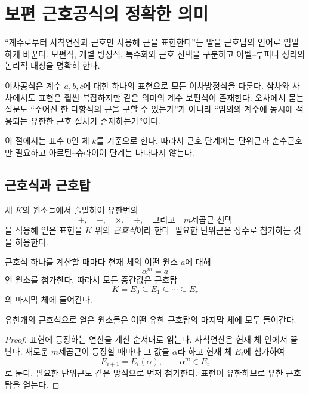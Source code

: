 \clearpage
\section{보편 근호공식의 정확한 의미}
\label{sec:universal-radical-formulas}

\begin{learninggoal}
``계수로부터 사칙연산과 근호만 사용해 근을 표현한다''는 말을 근호탑의 언어로 엄밀하게 바꾼다. 보편식, 개별 방정식, 특수화와 근호 선택을 구분하고 아벨--루피니 정리의 논리적 대상을 명확히 한다.
\end{learninggoal}

이차공식은 계수 $a,b,c$에 대한 하나의 표현으로 모든 이차방정식을 다룬다. 삼차와 사차에서도 표현은 훨씬 복잡하지만 같은 의미의 계수 보편식이 존재한다. 오차에서 묻는 질문도 ``주어진 한 다항식의 근을 구할 수 있는가''가 아니라 ``임의의 계수에 동시에 적용되는 유한한 근호 절차가 존재하는가''이다.

이 절에서는 표수 $0$인 체 $k$를 기준으로 한다. 따라서 근호 단계에는 단위근과 순수근호만 필요하고 아르틴--슈라이어 단계는 나타나지 않는다.

\subsection{근호식과 근호탑}

\begin{definition}[근호식]
체 $K$의 원소들에서 출발하여 유한번의
\[
  +,\quad-,\quad\times,\quad\div,
  \quad\text{그리고}\quad m\text{제곱근 선택}
\]
을 적용해 얻은 표현을 $K$ 위의 \emph{근호식}이라 한다. 필요한 단위근은 상수로 첨가하는 것을 허용한다.
\end{definition}

근호식 하나를 계산할 때마다 현재 체의 어떤 원소 $a$에 대해
\[
  \alpha^m=a
\]
인 원소를 첨가한다. 따라서 모든 중간값은 근호탑
\[
  K=E_0\subseteq E_1\subseteq\cdots\subseteq E_r
\]
의 마지막 체에 들어간다.

\begin{proposition}[식에서 체로]
\label{prop:radical-expressions-give-tower}
유한개의 근호식으로 얻은 원소들은 어떤 유한 근호탑의 마지막 체에 모두 들어간다.
\end{proposition}

\begin{proof}
표현에 등장하는 연산을 계산 순서대로 읽는다. 사칙연산은 현재 체 안에서 끝난다. 새로운 $m$제곱근이 등장할 때마다 그 값을 $\alpha$라 하고 현재 체 $E_i$에 첨가하여
\[
  E_{i+1}=E_i(\alpha),
  \qquad
  \alpha^m\in E_i
\]
로 둔다. 필요한 단위근도 같은 방식으로 먼저 첨가한다. 표현이 유한하므로 유한 근호탑을 얻는다.
\end{proof}

